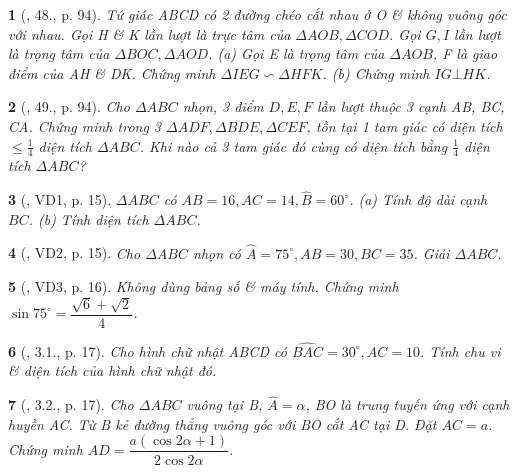 \documentclass{article}
\newtheorem{baitoan}{}
\begin{document}
\begin{baitoan}[\cite{Binh_Toan_9_tap_1}, 48., p. 94]
	Tứ giác ABCD có 2 đường chéo cắt nhau ở O \& không vuông góc với nhau. Gọi H \& K lần lượt là trực tâm của $\Delta AOB,\Delta COD$. Gọi $G,I$ lần lượt là trọng tâm của $\Delta BOC,\Delta AOD$. (a) Gọi E là trọng tâm của $\Delta AOB$, F là giao điểm của AH \& DK. Chứng minh $\Delta IEG\backsim\Delta HFK$. (b) Chứng minh $IG\bot HK$.
\end{baitoan}

\begin{baitoan}[\cite{Binh_Toan_9_tap_1}, 49., p. 94]
	Cho $\Delta ABC$ nhọn, 3 điểm $D,E,F$ lần lượt thuộc 3 cạnh AB, BC, CA. Chứng minh trong 3 $\Delta ADF,\Delta BDE,\Delta CEF$, tồn tại 1 tam giác có diện tích $\le\frac{1}{4}$ diện tích $\Delta ABC$. Khi nào cả 3 tam giác đó cùng có diện tích bằng $\frac{1}{4}$ diện tích $\Delta ABC$?
\end{baitoan}

\begin{baitoan}[\cite{TLCT_THCS_Toan_9_hinh_hoc}, VD1, p. 15]
	$\Delta ABC$ có $AB = 16,AC = 14,\widehat{B} = 60^\circ$. (a) Tính độ dài cạnh $BC$. (b) Tính diện tích $\Delta ABC$.
\end{baitoan}

\begin{baitoan}[\cite{TLCT_THCS_Toan_9_hinh_hoc}, VD2, p. 15]
	Cho $\Delta ABC$ nhọn có $\widehat{A} = 75^\circ,AB = 30,BC = 35$. Giải $\Delta ABC$.
\end{baitoan}

\begin{baitoan}[\cite{TLCT_THCS_Toan_9_hinh_hoc}, VD3, p. 16]
	Không dùng bảng số \& máy tính. Chứng minh $\sin75^\circ = \dfrac{\sqrt{6} + \sqrt{2}}{4}$.
\end{baitoan}

\begin{baitoan}[\cite{TLCT_THCS_Toan_9_hinh_hoc}, 3.1., p. 17]
	Cho hình chữ nhật ABCD có $\widehat{BAC} = 30^\circ,AC = 10$. Tính chu vi \& diện tích của hình chữ nhật đó.
\end{baitoan}

\begin{baitoan}[\cite{TLCT_THCS_Toan_9_hinh_hoc}, 3.2., p. 17]
	Cho $\Delta ABC$ vuông tại B, $\widehat{A} = \alpha$, BO là trung tuyến ứng với cạnh huyền AC. Từ B kẻ đường thẳng vuông góc với BO cắt AC tại D. Đặt $AC = a$. Chứng minh $AD = \dfrac{a(\cos2\alpha + 1)}{2\cos2\alpha}$.
\end{baitoan}
\end{document}
